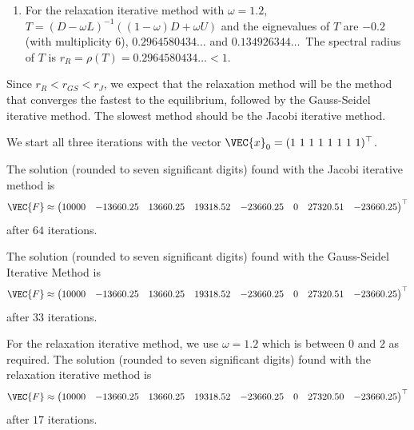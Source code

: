 {\begin{enumerate}
  $\displaystyle T=(D-L)^{-1}U$ and the
  eigenvalues of $T$ are $0$ (with multiplicity 7) and
  $0.5773502691\ldots$\  Hence, the spectral radius of $T$ is 
  $r_{GS} = \rho(T) = 0.5773502691\ldots < 1$.
\item For the relaxation iterative method with $\omega=1.2$,
  $T = (D-\omega L)^{-1} ((1-\omega)D+\omega U)$ and the eignevalues
  of $T$ are $-0.2$ (with multiplicity 6), $0.2964580434\ldots$ and
  $0.134926344\ldots$\  The spectral radius of $T$ is 
  $r_R = \rho(T) = 0.2964580434\ldots < 1$.
\end{enumerate}
Since $r_R < r_{GS} < r_J$, we expect that the relaxation method will
be the method that converges the fastest to the equilibrium, followed
by the Gauss-Seidel iterative method.  The slowest method should be
the Jacobi iterative method.

We start all three iterations with the vector
$\displaystyle \VEC{x}_0 = (1 \ 1 \ 1 \ 1 \ 1 \ 1 \ 1 \ 1)^\top$.

 The solution (rounded to seven significant digits) found with
the Jacobi iterative method is
\[
\VEC{F} \approx \begin{pmatrix}
10000 & -13660.25 & 13660.25 & 19318.52 &  -23660.25 & 0 &
27320.51 & -23660.25 \end{pmatrix}^\top
\]
after $64$ iterations.

 The solution (rounded to seven significant digits) found with
the Gauss-Seidel Iterative Method is
\[
\VEC{F} \approx \begin{pmatrix}
10000 & -13660.25 & 13660.25 & 19318.52 & -23660.25 & 0 &
27320.51 & -23660.25
\end{pmatrix}^\top
\]
after $33$ iterations.

 For the relaxation iterative method, we use $\omega = 1.2$
which is between $0$ and $2$ as required.  The solution (rounded to
seven significant digits) found with the relaxation iterative method
is
\[
\VEC{F} \approx \begin{pmatrix}
10000 & -13660.25 & 13660.25 & 19318.52 & -23660.25 & 0 &
27320.50 & -23660.25
\end{pmatrix}^\top
\]
after $17$ iterations.
}

